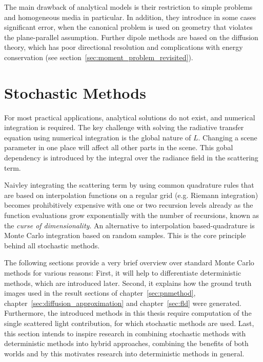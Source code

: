 The main drawback of analytical models is their restriction to simple problems and homogeneous media in particular. In addition, they introduce in some cases significant error, when the canonical problem is used on geometry that violates the plane-parallel assumption. Further dipole methods are based on the diffusion theory, which has poor directional resolution and complications with energy conservation (see section~\ref{sec:moment_problem_revisited}).

\section{Stochastic Methods}
\label{sec:foundations_mc}

For most practical applications, analytical solutions do not exist, and numerical integration is required. The key challenge with solving the radiative transfer equation using numerical integration is the global nature of $L$. Changing a scene parameter in one place will affect all other parts in the scene. This gobal dependency is introduced by the integral over the radiance field in the scattering term. 

Naivley integrating the scattering term by using common quadrature rules that are based on interpolation functions on a regular grid (e.g. Riemann integration) becomes prohibitively expensive with one or two recursion levels already as the function evaluations grow exponentially with the number of recursions, known as the \emph{curse of dimensionality}. An alternative to interpolation based-quadrature is Monte Carlo integration based on random samples. This is the core principle behind all stochastic methods.

The following sections provide a very brief overview over standard Monte Carlo methods for various reasons: First, it will help to differentiate deterministic methods, which are introduced later. Second, it explains how the ground truth images used in the result sections of chapter~\ref{sec:pnmethod}, chapter~\ref{sec:diffusion_approximation} and chapter~\ref{sec:fld} were generated. Furthermore, the introduced methods in this thesis require computation of the single scattered light contribution, for which stochastic methods are used. Last, this section intends to inspire research in combining stochastic methods with deterministic methods into hybrid approaches, combining the benefits of both worlds and by this motivates research into deterministic methods in general.

